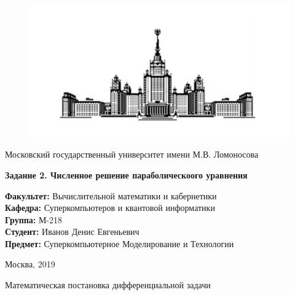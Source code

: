 \documentclass[12pt,a4paper]{scrartcl}
\begin{document}
\begin{titlepage}

    \begin{figure}[h]
        \centering
        \includegraphics[scale=0.5]{gzlogo_new.png}
    \end{figure}

    \begin{center}
        \large
        Московский государственный университет имени М.В. Ломоносова

        \vfill

        \LARGE
        \textbf{Задание 2. Численное решение параболическоого уравнения}

        \vfill

        \hfill\begin{minipage}{0.6\textwidth}
            \normalsize
            \textbf{Факультет:} Вычислительной математики и кабернетики \\
            \textbf{Кафедра:} Суперкомпьютеров и квантовой информатики \\
            \textbf{Группа:} М-218 \\
            \textbf{Студент:} Иванов Денис Евгеньевич \\
            \textbf{Предмет:} Суперкомпьютерное Моделирование и Технологии \\
        \end{minipage}
        \vfill
        

    \end{center}

    \begin{center}
        \large
        Москва, 2019
    \end{center}
\end{titlepage}

\Large
Математическая постановка дифференциальной задачи
\end{document}
